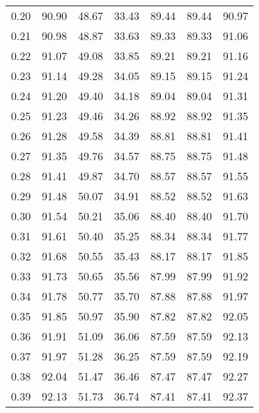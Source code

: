 \begin{tabular}{|c|c|c|c|c|c|c|}
      0.20 &     90.90 &     48.67 &      33.43 &   89.44 &      89.44 &         90.97 \\
      0.21 &     90.98 &     48.87 &      33.63 &   89.33 &      89.33 &         91.06 \\
      0.22 &     91.07 &     49.08 &      33.85 &   89.21 &      89.21 &         91.16 \\
      0.23 &     91.14 &     49.28 &      34.05 &   89.15 &      89.15 &         91.24 \\
      0.24 &     91.20 &     49.40 &      34.18 &   89.04 &      89.04 &         91.31 \\
      0.25 &     91.23 &     49.46 &      34.26 &   88.92 &      88.92 &         91.35 \\
      0.26 &     91.28 &     49.58 &      34.39 &   88.81 &      88.81 &         91.41 \\
      0.27 &     91.35 &     49.76 &      34.57 &   88.75 &      88.75 &         91.48 \\
      0.28 &     91.41 &     49.87 &      34.70 &   88.57 &      88.57 &         91.55 \\
      0.29 &     91.48 &     50.07 &      34.91 &   88.52 &      88.52 &         91.63 \\
      0.30 &     91.54 &     50.21 &      35.06 &   88.40 &      88.40 &         91.70 \\
      0.31 &     91.61 &     50.40 &      35.25 &   88.34 &      88.34 &         91.77 \\
      0.32 &     91.68 &     50.55 &      35.43 &   88.17 &      88.17 &         91.85 \\
      0.33 &     91.73 &     50.65 &      35.56 &   87.99 &      87.99 &         91.92 \\
      0.34 &     91.78 &     50.77 &      35.70 &   87.88 &      87.88 &         91.97 \\
      0.35 &     91.85 &     50.97 &      35.90 &   87.82 &      87.82 &         92.05 \\
      0.36 &     91.91 &     51.09 &      36.06 &   87.59 &      87.59 &         92.13 \\
      0.37 &     91.97 &     51.28 &      36.25 &   87.59 &      87.59 &         92.19 \\
      0.38 &     92.04 &     51.47 &      36.46 &   87.47 &      87.47 &         92.27 \\
      0.39 &     92.13 &     51.73 &      36.74 &   87.41 &      87.41 &         92.37 \\

\end{tabular}
